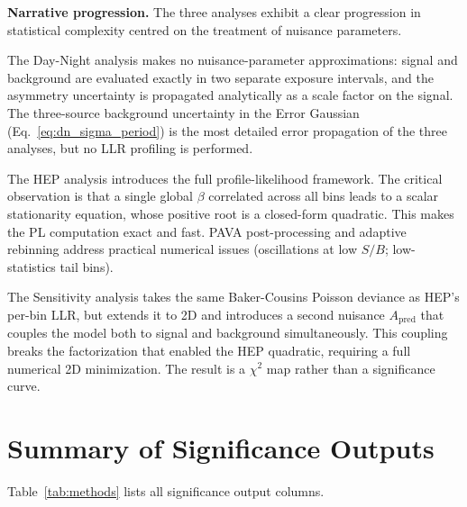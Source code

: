 \documentclass[12pt,a4paper]{article}
\newcommand{\Apred}{A_{\mathrm{pred}}}
\begin{document}
\medskip
\noindent\textbf{Narrative progression.}
The three analyses exhibit a clear progression in statistical complexity
centred on the treatment of nuisance parameters.

The Day-Night analysis makes no nuisance-parameter approximations:
signal and background are evaluated exactly in two separate exposure
intervals, and the asymmetry uncertainty is propagated analytically as a
scale factor on the signal.
The three-source background uncertainty in the Error Gaussian
(Eq.~\eqref{eq:dn_sigma_period}) is the most detailed error propagation
of the three analyses, but no LLR profiling is performed.

The HEP analysis introduces the full profile-likelihood framework.
The critical observation is that a single global $\beta$ correlated across
all bins leads to a scalar stationarity equation, whose positive root is
a closed-form quadratic.  This makes the PL computation exact and fast.
PAVA post-processing and adaptive rebinning address practical numerical
issues (oscillations at low $S/B$; low-statistics tail bins).

The Sensitivity analysis takes the same Baker-Cousins Poisson deviance
as HEP's per-bin LLR, but extends it to 2D and introduces a second
nuisance $\Apred$ that couples the model both to signal and background
simultaneously.  This coupling breaks the factorization that enabled the
HEP quadratic, requiring a full numerical 2D minimization.
The result is a $\chi^2$ map rather than a significance curve.

\section{Summary of Significance Outputs}
\label{sec:summary}

Table~\ref{tab:methods} lists all significance output columns.
\end{document}
